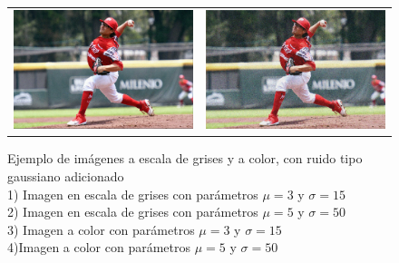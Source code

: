 \begin{landscape}
\begin{figure}[!h]
\begin{tabular}{cc}
				\includegraphics[width=12.25cm]{Imagenes/Ruido_gauss_color_1.png} & \includegraphics[width=12.25cm]{Imagenes/Ruido_gauss_color_2.png}
			\end{tabular}
			\label{Ruido_Gauss}
			\caption{Ejemplo de imágenes a escala de grises y a color, con ruido tipo gaussiano adicionado \\ 1) Imagen en escala de grises con parámetros $\mu= 3$ y $\sigma = 15$ \\ 2) Imagen en escala de grises con parámetros $\mu= 5$ y $\sigma = 50$ \\ 3) Imagen a color con parámetros $\mu = 3$ y $\sigma = 15$ \\ 4)Imagen a color con parámetros $\mu = 5$ y $\sigma = 50$}
		\end{figure}
	\end{landscape}


